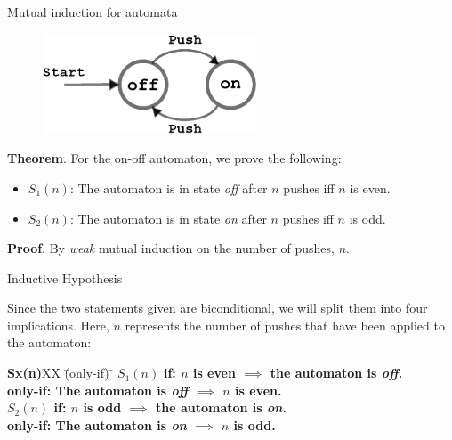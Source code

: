 \documentclass[style=sailor,size=12pt]{powerdot}
\begin{document}

\begin{wideslide}[bm=,toc=]{Mutual induction for automata}
\begin{figure}[h]
\centering
\includegraphics[width=2.5in, height=.75in,keepaspectratio=true]{switch.eps}
\label{2sp}
\end{figure}

{\bf Theorem}. For the on-off automaton, we prove the following: 
\begin{itemize}
\item $S_1(n)$: The automaton is in state {\em off\/} after $n$ pushes iff $n$ is even.

\item $S_2(n)$: The automaton is in state {\em on\/} after $n$ pushes iff $n$ is odd.
\end{itemize}
{\bf Proof}.  By {\em weak\/} mutual induction on the number of pushes, $n$. 

\end{wideslide}

\begin{wideslide}[bm=,toc=]{Inductive Hypothesis}

Since the two statements given are biconditional, we will split them into four
implications. Here, $n$ represents the number of pushes that have been applied to
the automaton:
\begin{tabbing}
{\bf Sx(n)}XX \=  (only-if) \= \kill
{\bf $S_1(n)$}  \>
           \bf{if:} \> 
          $n$ is even $\implies$ the automaton is {\em off\/}.   \\[2ex]
               \>
     \bf{only-if:}\> 
          The automaton is {\em off\/} $\implies$ $n$ is even.   \\[4ex]
{\bf $S_2(n)$} \>
          \bf{if:} \> 
        $n$ is odd $\implies$ the automaton is {\em on\/}. \\[2ex]
               \>
     \bf{only-if:} \> 
        The automaton is {\em on\/} $\implies$ $n$ is odd. \\[2ex]
\end{tabbing}

\end{wideslide}
\end{document}
